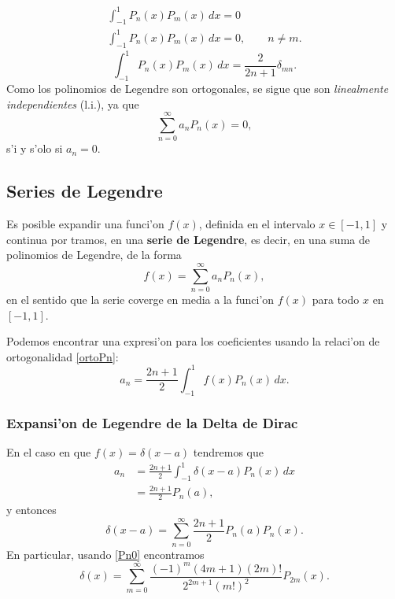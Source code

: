 \begin{gather}
[n (n + 1) - m (m + 1)]\int_{-1}^1 P_n(x) P_m(x)\,d x = 0 
\\
\int_{-1}^1 P_n(x) P_m(x)\,d x = 0, \qquad n\neq m.
\end{gather}
\begin{equation}\label{ortoPn}
\boxed{\int_{-1}^{1}P_n(x)P_m(x)\,dx=\frac{2}{2n+1}\delta_{mn}.}
\end{equation}
Como los polinomios de Legendre son ortogonales, se sigue que son \textit{linealmente independientes} (l.i.), ya que
\begin{equation}
\sum_{n=0}^\infty a_nP_n(x)=0,
\end{equation}
s'i y s'olo si $a_n=0$.
\subsection{Series de Legendre}
Es posible expandir una funci'on $f(x)$, definida en el intervalo $x\in[-1,1]$ y continua por tramos, en una \textbf{serie de Legendre}, es decir, en una suma de polinomios de Legendre, de la forma
\begin{equation}
f(x)=\sum_{n=0}^\infty a_nP_n(x),
\end{equation}
en el sentido que la serie coverge en media a la funci'on $f(x)$ para todo $x$ en $[-1,1]$.

Podemos encontrar una expresi'on para los coeficientes usando la relaci'on de ortogonalidad \eqref{ortoPn}:
\begin{equation}
a_n=\frac{2n+1}{2}\int_{-1}^1 f(x)P_n(x)\,dx.
\end{equation}
\subsubsection{Expansi'on de Legendre de la Delta de Dirac}
En el caso en que $f(x)=\delta(x-a)$ tendremos que
\begin{align}
a_n &= \frac{2n+1}{2}\int_{-1}^1 \delta(x-a)P_n(x)\,dx \\
&= \frac{2n+1}{2}P_n(a),
\end{align}
y entonces
\begin{equation}
\delta(x-a)=\sum_{n=0}^\infty \frac{2n+1}{2}P_n(a)P_n(x).
\end{equation}
En particular, usando \eqref{Pn0} encontramos
\begin{equation}
\delta(x)=\sum_{m=0}^\infty \frac{(-1)^m(4m+1)(2m)!}{2^{2m+1}(m!)^2}P_{2m}(x).
\end{equation}

